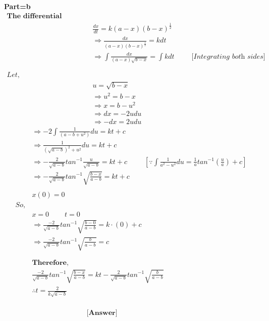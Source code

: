 \documentclass{article}
\begin{document}
\begin{homeworkProblem}
    \textbf{Part=b}
    \\
    \[
    \begin{split}
        \textbf{The differential equation is}&
        \\
        &\frac{dx}{dt} = k (a-x)(b-x)^{\frac{1}{2}}
        \\
        &\Rightarrow \frac{dx}{(a-x)(b-x)^{\frac{1}{2}}} = kdt
        \\
        &\Rightarrow \int \frac{dx}{(a-x) \sqrt{b-x}} = \int k dt\ \ \ \ \ \ \ \ \  \ \ \textit{[Integrating both sides]}
        \\\\\\
        Let,
        \\
        &u = \sqrt{b-x}
        \\
        &\Rightarrow u^2 = b-x
        \\
        &\Rightarrow x = b- u^2
        \\
        &\Rightarrow dx = - 2 u du
        \\
        &\Rightarrow - dx = 2 u du
    \end{split}
    \]
    \pagebreak
    \[
    \begin{split}
        & \Rightarrow - 2 \int \frac{1}{(a-b+u^2)} du = kt + c
        \\
        & \Rightarrow \frac{1}{(\sqrt{a-b})^2 + u^2} du = kt + c
        \\
        & \Rightarrow - \frac{2}{\sqrt{a-b}} tan^{-1} \frac{u}{\sqrt{a-b}} = kt + c  \ \ \ \ \ \ \ \ \ \ \ 
        \left[\because \int \frac{1}{a^2 - u^2}du = \frac{1}{a}tan^{-1} (\frac{u}{a})+c \right]
        \\
        &\Rightarrow - \frac{2}{\sqrt{a-b}} tan^{-1} \sqrt{\frac{b-x}{a-b}} = kt + c
        \\\\
        &x(0) = 0
        \\
        So,
        \\
        &x=0 \ \ \ \ \ \ \ \ \ \ t=0
        \\
        &\Rightarrow \frac{-2}{\sqrt{a-b}} tan^{-1} \sqrt{\frac{b-0}{a-b}} = k \cdot (0) + c 
        \\
        &\Rightarrow \frac{-2}{\sqrt{a-b}} tan^{-1} \sqrt{\frac{b}{a-b}} = c
        \\\\\\
        & \textbf{Therefore,}
        \\
        &\frac{-2}{\sqrt{a-b}} tan^{-1} \sqrt{\frac{b-x}{a-b}} = kt - \frac{2}{\sqrt{a-b}} tan^{-1} \sqrt{\frac{b}{a-b}}
        \\
        &\therefore t = \frac{2}{k\sqrt{a-b}}
        \\ \\ \\ \\
        &\ \ \ \ \ \ \ \ \ \ \ \ \ \ \ \ \ \ \ \  \ \ \ \ \ \ \ \ \ \ \ \ \ \ \ \textbf{[Answer]}
    \end{split}
    \]
\end{homeworkProblem}
\pagebreak
\end{document}
